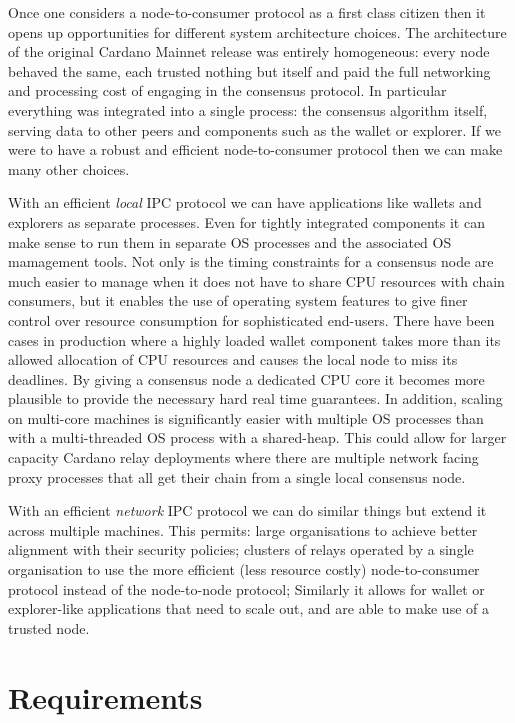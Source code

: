 \documentclass{report}
\theoremstyle{definition}{
  \newtheorem{lemma}{Lemma}[section] %
  \newtheorem{definition}[lemma]{Definition}
}
\theoremstyle{theorem}{
  \newtheorem{invariant}[lemma]{Invariant}
  \newtheorem{proofobligation}[lemma]{Proof Obligation}
}
\numberwithin{equation}{lemma}
\begin{document}
Once one considers a node-to-consumer protocol as a first class citizen then it
opens up opportunities for different system architecture choices.
The architecture of the original Cardano Mainnet release was entirely homogeneous:
every node behaved the same, each trusted nothing but itself and paid the full
networking and processing cost of engaging in the consensus protocol.  In
particular everything was integrated into a single process: the consensus
algorithm itself, serving data to other peers and components such as the wallet
or explorer. If we were to have a robust and efficient node-to-consumer protocol
then we can make many other choices.

With an efficient \emph{local} IPC protocol we can have applications
like wallets and explorers as separate processes. Even for tightly
integrated components it can make sense to run them in separate OS
processes and the associated OS mamagement tools. Not only is the
timing constraints for a consensus node are much easier to manage when
it does not have to share CPU resources with chain consumers, but it
enables the use of operating system features to give finer control
over resource consumption for sophisticated end-users.  There have
been cases in production where a highly loaded wallet component takes
more than its allowed allocation of CPU resources and causes the local
node to miss its deadlines.  By giving a consensus node a dedicated
CPU core it becomes more plausible to provide the necessary hard real
time guarantees. In addition, scaling on multi-core machines is
significantly easier with multiple OS processes than with a
multi-threaded OS process with a shared-heap. This could allow for
larger capacity Cardano relay deployments where there are multiple
network facing proxy processes that all get their chain from a single
local consensus node.

With an efficient \emph{network} IPC protocol we can do similar things
but extend it across multiple machines. This permits: large
organisations to achieve better alignment with their security
policies; clusters of relays operated by a single organisation to use
the more efficient (less resource costly) node-to-consumer protocol
instead of the node-to-node protocol; Similarly it allows for wallet
or explorer-like applications that need to scale out, and are able to
make use of a trusted node.

\section{Requirements}
\end{document}
